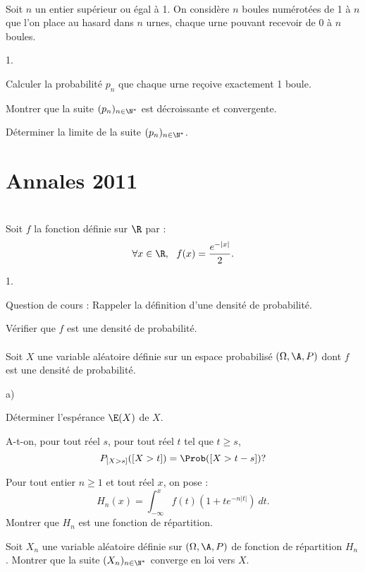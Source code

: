 \documentclass[11pt]{article}%
\begin{document}
\begin{exerciceSP}~\\
  Soit $n$ un entier supérieur ou égal à 1. On considère $n$ boules
  numérotées de 1 à $n$ que l'on place au hasard dans $n$ urnes,
  chaque urne pouvant recevoir de 0 à $n$ boules. 
  \begin{noliste}{1.}
    \setlength{\itemsep}{2mm}
  \item Calculer la probabilité $p_n$ que chaque urne reçoive
    exactement 1 boule. 
  \item Montrer que la suite $(p_n)_{n \in \N^*}$ est décroissante et
    convergente. 
  \item Déterminer la limite de la suite $(p_n)_{n \in \N^*}$.
  \end{noliste}
\end{exerciceSP}


\newpage


\section{Annales 2011}

\begin{exerciceAP}~\\
  Soit $f$ la fonction définie sur $\R$ par :
  \[
  \forall x \in \R,\ \ f(x) = \frac{e^{- \vert x \vert} }{2}.
  \]
  \begin{noliste}{1.}
    \setlength{\itemsep}{2mm}
  \item Question de cours : Rappeler la définition d'une densité de probabilité.
  \item Vérifier que $f$ est une densité de probabilité. \\ \\
    Soit $X$ une variable aléatoire définie sur un espace probabilisé
    $(\Omega , \A , P)$ dont $f$ est une densité de probabilité.
  \item 
    \begin{noliste}{a)}
    \setlength{\itemsep}{2mm} 
    \item Déterminer l'espérance $\E(X)$ de $X$.
    \item A-t-on, pour tout réel $s$, pour tout réel $t$ tel que $t \geq s$, 
      \[
      P_{[X > s]} ( [X > t]) = \Prob( [X > t - s])?
      \]
    \end{noliste}
  \item Pour tout entier $n \geq 1$ et tout réel $x$, on pose : 
    \[
    H_n(x) = \int_{-\infty}^x f(t) (1 + t e^{- n \vert t \vert} )\ dt.
    \]
    Montrer que $H_n$ est une fonction de répartition.
  \item Soit $X_n$ une variable aléatoire définie sur $(\Omega , \A ,
    P)$ de fonction de répartition $H_n$. Montrer que la suite
    $(X_n)_{n \in \N^*}$ converge en loi vers $X$.
  \end{noliste}
\end{exerciceAP}
\end{document}
